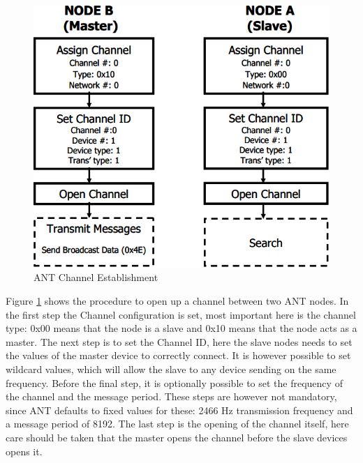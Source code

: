 \begin{figure}[H]
	\centering
	\includegraphics[scale=0.7]{./pics/ANTsetup.png}
	\caption{ANT Channel Establishment}\label{fig:antsetup}
\end{figure}

Figure \ref{fig:antsetup} shows the procedure to open up a channel between two ANT nodes. In the first step the Channel configuration is set, most important here is the channel type: 0x00 means that the node is a slave and 0x10 means that the node acts as a master. The next step is to set the Channel ID, here the slave nodes needs to set the values of the master device to correctly connect. It is however possible to set wildcard values, which will allow the slave to any device sending on the same frequency. Before the final step, it is optionally possible to set the frequency of the channel and the message period. These steps are however not mandatory, since ANT defaults to fixed values for these: 2466 Hz transmission frequency and a message period of 8192. The last step is the opening of the channel itself, here care should be taken that the master opens the channel before the slave devices opens it.

